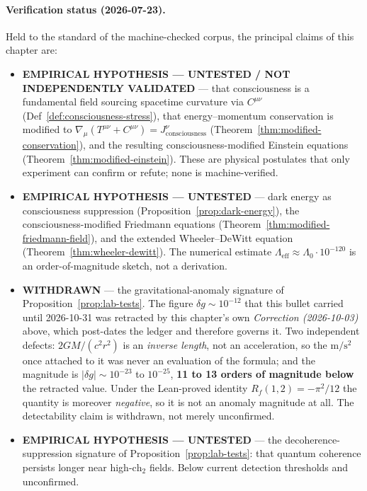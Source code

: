 \paragraph{Verification status (2026-07-23).}
Held to the standard of the machine-checked corpus, the principal claims of this chapter are:
\begin{itemize}
\item \textbf{EMPIRICAL HYPOTHESIS --- UNTESTED / NOT INDEPENDENTLY VALIDATED} --- that consciousness is a fundamental field sourcing spacetime curvature via $C^{\mu\nu}$ (Def~\ref{def:consciousness-stress}), that energy--momentum conservation is modified to $\nabla_\mu(T^{\mu\nu}+C^{\mu\nu})=J^\nu_{\text{consciousness}}$ (Theorem~\ref{thm:modified-conservation}), and the resulting consciousness-modified Einstein equations (Theorem~\ref{thm:modified-einstein}). These are physical postulates that only experiment can confirm or refute; none is machine-verified.
\item \textbf{EMPIRICAL HYPOTHESIS --- UNTESTED} --- dark energy as consciousness suppression (Proposition~\ref{prop:dark-energy}), the consciousness-modified Friedmann equations (Theorem~\ref{thm:modified-friedmann-field}), and the extended Wheeler--DeWitt equation (Theorem~\ref{thm:wheeler-dewitt}). The numerical estimate $\Lambda_{\text{eff}}\approx\Lambda_0\cdot10^{-120}$ is an order-of-magnitude sketch, not a derivation.
\item \textbf{WITHDRAWN} --- the gravitational-anomaly signature of Proposition~\ref{prop:lab-tests}. The figure $\delta g\sim10^{-12}$ that this bullet carried until 2026-10-31 was retracted by this chapter's own \emph{Correction (2026-10-03)} above, which post-dates the ledger and therefore governs it. Two independent defects: $2GM/(c^2r^2)$ is an \emph{inverse length}, not an acceleration, so the $\mathrm{m/s^2}$ once attached to it was never an evaluation of the formula; and the magnitude is $|\delta g|\sim10^{-23}$ to $10^{-25}$, \textbf{11 to 13 orders of magnitude below} the retracted value. Under the Lean-proved identity $R_f(1,2)=-\pi^2/12$ the quantity is moreover \emph{negative}, so it is not an anomaly magnitude at all. The detectability claim is withdrawn, not merely unconfirmed.
\item \textbf{EMPIRICAL HYPOTHESIS --- UNTESTED} --- the decoherence-suppression signature of Proposition~\ref{prop:lab-tests}: that quantum coherence persists longer near high-$\text{ch}_2$ fields. Below current detection thresholds and unconfirmed.

\end{itemize}
